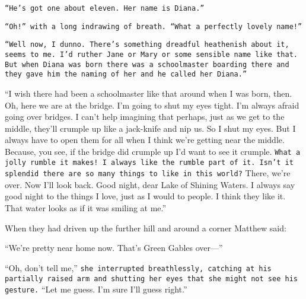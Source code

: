 \documentclass[a4paper]{article}
\begin{document}
\texttt{``He's got one about eleven. Her name is Diana.''}

\texttt{``Oh!'' with a long indrawing of breath. ``What a perfectly lovely name!''}

\texttt{``Well now, I dunno. There's something dreadful heathenish about it, seems to me. I'd ruther Jane or Mary or some sensible name like that. But when Diana was born there was a schoolmaster boarding there and they gave him the naming of her and he called her Diana.''}

\textsf{``I wish there had been a schoolmaster like that around when I was born, then. Oh, here we are at the bridge. I'm going to shut my eyes tight. \textrm{I'm always afraid going over bridges. I can't help imagining that perhaps, just as we get to the middle, they'll crumple up like a jack-knife and nip us. So I shut my eyes.} But I always have to open them for all when I think we're getting near the middle. Because, you see, if the bridge did crumple up I'd want to see it crumple. \texttt{What a jolly rumble it makes! I always like the rumble part of it. Isn't it splendid there are so many things to like in this world?} There, we're over. Now I'll look back. Good night, dear Lake of Shining Waters. I always say good night to the things I love, just as I would to people. I think they like it. That water looks as if it was smiling at me.''}

When they had driven up \textsf{the further hill and} around a corner Matthew said:

``We're pretty near \textrm{home now. That's Green} Gables over---''

``Oh, don't tell me,'' \texttt{she interrupted breathlessly, catching at his partially raised arm and shutting her eyes that she might not see his gesture.} ``Let me guess. I'm sure I'll guess right.''
\end{document}
